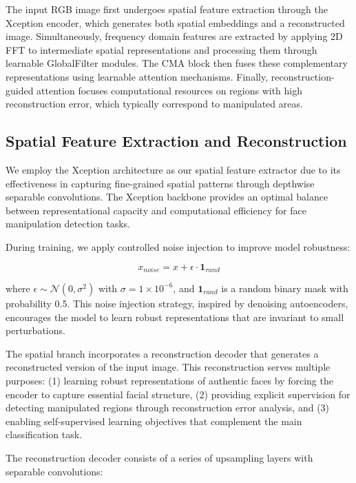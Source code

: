 \documentclass[letterpaper]{article} %
\begin{document}
The input RGB image first undergoes spatial feature extraction through the Xception encoder, which generates both spatial embeddings and a reconstructed image. Simultaneously, frequency domain features are extracted by applying 2D FFT to intermediate spatial representations and processing them through learnable GlobalFilter modules. The CMA block then fuses these complementary representations using learnable attention mechanisms. Finally, reconstruction-guided attention focuses computational resources on regions with high reconstruction error, which typically correspond to manipulated areas.

\subsection{Spatial Feature Extraction and Reconstruction}

We employ the Xception architecture as our spatial feature extractor due to its effectiveness in capturing fine-grained spatial patterns through depthwise separable convolutions. The Xception backbone provides an optimal balance between representational capacity and computational efficiency for face manipulation detection tasks.

During training, we apply controlled noise injection to improve model robustness:

\begin{equation}
x_{noise} = x + \epsilon \cdot \mathbf{1}_{rand}
\end{equation}

where $\epsilon \sim \mathcal{N}(0, \sigma^2)$ with $\sigma = 1 \times 10^{-6}$, and $\mathbf{1}_{rand}$ is a random binary mask with probability 0.5. This noise injection strategy, inspired by denoising autoencoders, encourages the model to learn robust representations that are invariant to small perturbations.

The spatial branch incorporates a reconstruction decoder that generates a reconstructed version of the input image. This reconstruction serves multiple purposes: (1) learning robust representations of authentic faces by forcing the encoder to capture essential facial structure, (2) providing explicit supervision for detecting manipulated regions through reconstruction error analysis, and (3) enabling self-supervised learning objectives that complement the main classification task.

The reconstruction decoder consists of a series of upsampling layers with separable convolutions:
\end{document}
